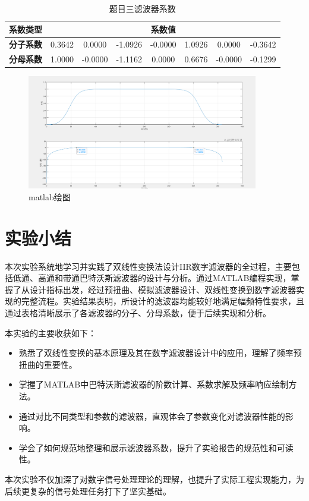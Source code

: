 \documentclass[12pt,hyperref,a4paper,UTF8]{ctexart}
\begin{document}
\begin{table}[H]
\centering
\caption{题目三滤波器系数}
\label{tab:filter_coef3}
\begin{tabular}{|c|c|c|c|c|c|c|c|}
\hline
\textbf{系数类型} & \multicolumn{7}{c|}{\textbf{系数值}} \\
\hline
\textbf{分子系数} & 0.3642 & 0.0000 & -1.0926 & -0.0000 & 1.0926 & 0.0000 & -0.3642 \\
\hline
\textbf{分母系数} & 1.0000 & -0.0000 & -1.1162 & 0.0000 & 0.6676 & -0.0000 & -0.1299 \\
\hline
\end{tabular}
\end{table}

\begin{figure}[H] %
        \centering
        \includegraphics[width=0.9\textwidth]{figures/303.png} %
        \caption{matlab绘图} %
        \label{fig:example} %
\end{figure}



\section{实验小结}

本次实验系统地学习并实践了双线性变换法设计IIR数字滤波器的全过程，主要包括低通、高通和带通巴特沃斯滤波器的设计与分析。通过MATLAB编程实现，掌握了从设计指标出发，经过预扭曲、模拟滤波器设计、双线性变换到数字滤波器实现的完整流程。实验结果表明，所设计的滤波器均能较好地满足幅频特性要求，且通过表格清晰展示了各滤波器的分子、分母系数，便于后续实现和分析。

本实验的主要收获如下：

\begin{itemize}
    \item 熟悉了双线性变换的基本原理及其在数字滤波器设计中的应用，理解了频率预扭曲的重要性。
    \item 掌握了MATLAB中巴特沃斯滤波器的阶数计算、系数求解及频率响应绘制方法。
    \item 通过对比不同类型和参数的滤波器，直观体会了参数变化对滤波器性能的影响。
    \item 学会了如何规范地整理和展示滤波器系数，提升了实验报告的规范性和可读性。
\end{itemize}

本次实验不仅加深了对数字信号处理理论的理解，也提升了实际工程实现能力，为后续更复杂的信号处理任务打下了坚实基础。
\end{document}
